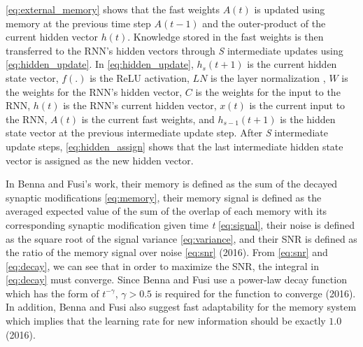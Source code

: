 \documentclass[10pt,letterpaper]{article}
\begin{document}
\eqref{eq:external_memory} shows that the fast weights $A(t)$ is updated using memory at the previous time step $A(t-1)$ and the outer-product of the current hidden vector $h(t)$.
Knowledge stored in the fast weights is then transferred to the RNN's hidden vectors through \emph{S} intermediate updates using \eqref{eq:hidden_update}.
In \eqref{eq:hidden_update}, $h_s(t+1)$ is the current hidden state vector, $f(.)$ is the ReLU activation, $LN$ is the layer normalization \cite{ln}, $W$ is the weights for the RNN's hidden vector, $C$ is the weights for the input to the RNN, $h(t)$ is the RNN's current hidden vector, $x(t)$ is the current input to the RNN, $A(t)$ is the current fast weights, and $h_{s-1}(t+1)$ is the hidden state vector at the previous intermediate update step.
After \emph{S} intermediate update steps, \eqref{eq:hidden_assign} shows that the last intermediate hidden state vector is assigned as the new hidden vector.


In Benna and Fusi's work, their memory is defined as the sum of the decayed synaptic modifications \eqref{eq:memory},
their memory signal is defined as the averaged expected value of the sum of the overlap of each memory with its corresponding synaptic modification given time \emph{t} \eqref{eq:signal}, their noise is defined as the square root of the signal variance \eqref{eq:variance}, and their SNR is defined as the ratio of the memory signal over noise \eqref{eq:snr} (2016).
From \eqref{eq:snr} and \eqref{eq:decay}, we can see that in order to maximize the SNR, the integral in \eqref{eq:decay} must converge.
Since Benna and Fusi use a power-law decay function which has the form of \emph{$t^{-\gamma}$}, $\gamma > 0.5$ is required for the function to converge (2016).
In addition, Benna and Fusi also suggest fast adaptability for the memory system which implies that the learning rate for new information should be exactly $1.0$ (2016).
\end{document}
